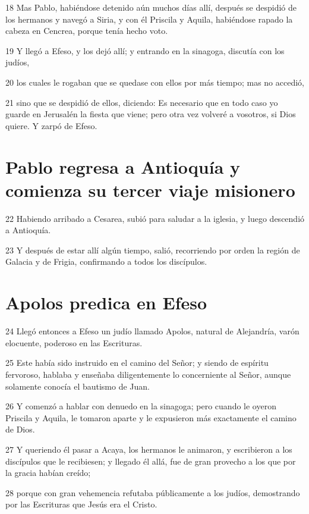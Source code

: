\par 18 Mas Pablo, habiéndose detenido aún muchos días allí, después se despidió de los hermanos y navegó a Siria, y con él Priscila y Aquila, habiéndose rapado la cabeza en Cencrea, porque tenía hecho voto.
\par 19 Y llegó a Efeso, y los dejó allí; y entrando en la sinagoga, discutía con los judíos,
\par 20 los cuales le rogaban que se quedase con ellos por más tiempo; mas no accedió,
\par 21 sino que se despidió de ellos, diciendo: Es necesario que en todo caso yo guarde en Jerusalén la fiesta que viene; pero otra vez volveré a vosotros, si Dios quiere. Y zarpó de Efeso.

\section*{Pablo regresa a Antioquía y comienza su tercer viaje misionero}

\par 22 Habiendo arribado a Cesarea, subió para saludar a la iglesia, y luego descendió a Antioquía.
\par 23 Y después de estar allí algún tiempo, salió, recorriendo por orden la región de Galacia y de Frigia, confirmando a todos los discípulos.

\section*{Apolos predica en Efeso}

\par 24 Llegó entonces a Efeso un judío llamado Apolos, natural de Alejandría, varón elocuente, poderoso en las Escrituras.
\par 25 Este había sido instruido en el camino del Señor; y siendo de espíritu fervoroso, hablaba y enseñaba diligentemente lo concerniente al Señor, aunque solamente conocía el bautismo de Juan.
\par 26 Y comenzó a hablar con denuedo en la sinagoga; pero cuando le oyeron Priscila y Aquila, le tomaron aparte y le expusieron más exactamente el camino de Dios.
\par 27 Y queriendo él pasar a Acaya, los hermanos le animaron, y escribieron a los discípulos que le recibiesen; y llegado él allá, fue de gran provecho a los que por la gracia habían creído;
\par 28 porque con gran vehemencia refutaba públicamente a los judíos, demostrando por las Escrituras que Jesús era el Cristo.

